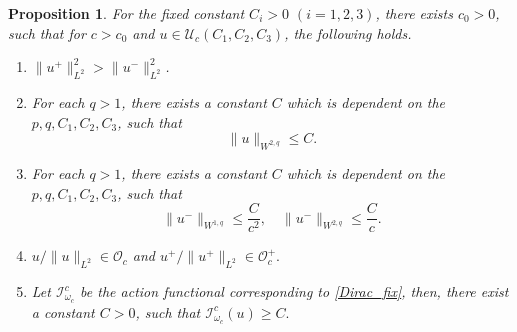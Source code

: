\documentclass{amsart}
\theoremstyle{plain}
\newtheorem{proposition}[theorem]{Proposition}
\theoremstyle{definition}
\theoremstyle{remark}
\numberwithin{equation}{section} \numberwithin{figure}{section}
\begin{document}
\begin{proposition}\label{bound}  For the fixed constant $C_i>0$ $(i=1,2,3)$,
  there exists $c_0>0$, such that for $c>c_0$ and $u\in \mathscr{U}_c(C_1, C_2, C_3)$,
  the following holds.
  \begin{enumerate}
    \item [(1)] $\|u^+\|_{L^2}^2>\|u^-\|_{L^2}^2$.
    \item [(2)] For each $q>1$, there exists a constant $C$ which is  dependent on the $p, q, C_1, C_2, C_3$, such that
    $$
   \| u\|_{W^{2,q}} \leq C.$$
   \item[(3)] For each $q>1$, there exists a constant $C$ which is  dependent on the $p, q, C_1, C_2, C_3$, such that
   $$
   \| u^-\|_{W^{1,q}}\leq\frac{C}{c^2}, \quad \| u^-\|_{W^{2,q}}\leq\frac{C}{c}.
   $$
   \item[(4)] $u/\|u\|_{L^2} \in \mathcal{O}_c$ and 
 $u^+/\|u^+\|_{L^2} \in \mathcal{O}_c^+.$
 \item [(5)] Let $\mathcal{I}^c_{\omega_c}$ be the action functional corresponding to \eqref{Dirac_fix}, then, there exist a constant $C>0$, such that
 $\mathcal{I}^c_{\omega_c}(u)\geq C.$
  \end{enumerate}
\end{proposition}
\end{document}
